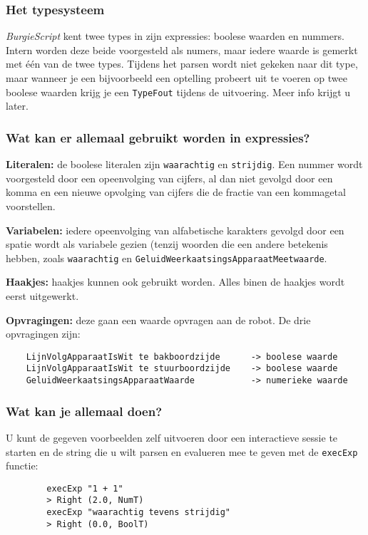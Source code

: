 \documentclass[11pt]{article}
\begin{document}
\subsubsection{Het typesysteem}
\textit{BurgieScript} kent twee types in zijn expressies: boolese waarden en nummers. Intern worden deze beide voorgesteld als numers, maar iedere waarde is gemerkt met één van de twee types. Tijdens het parsen wordt niet gekeken naar dit type, maar wanneer je een bijvoorbeeld een optelling probeert uit te voeren op twee boolese waarden krijg je een \texttt{TypeFout} tijdens de uitvoering. Meer info krijgt u later.

\subsubsection{Wat kan er allemaal gebruikt worden in expressies?}
    \begin{description}
        \item{\bf Literalen:} de boolese literalen zijn \texttt{waarachtig} en \texttt{strijdig}. Een nummer wordt voorgesteld door een opeenvolging van cijfers, al dan niet gevolgd door een komma en een nieuwe opvolging van cijfers die de fractie van een kommagetal voorstellen.
        \item{\bf Variabelen:} iedere opeenvolging van alfabetische karakters gevolgd door een spatie wordt als variabele gezien (tenzij woorden die een andere betekenis hebben, zoals \texttt{waarachtig} en \texttt{GeluidWeerkaatsingsApparaatMeetwaarde}.
        \item{\bf Haakjes:} haakjes kunnen ook gebruikt worden. Alles binen de haakjes wordt eerst uitgewerkt.
        \item{\bf Opvragingen:} deze gaan een waarde opvragen aan de robot. De drie opvragingen zijn:
        \begin{lstlisting}
    LijnVolgApparaatIsWit te bakboordzijde      -> boolese waarde
    LijnVolgApparaatIsWit te stuurboordzijde    -> boolese waarde
    GeluidWeerkaatsingsApparaatWaarde           -> numerieke waarde\end{lstlisting}
\end{description}

\subsubsection{Wat kan je allemaal doen?}
U kunt de gegeven voorbeelden zelf uitvoeren door een interactieve sessie te starten en de string die u wilt parsen en evalueren mee te geven met de \texttt{execExp} functie:
        \begin{lstlisting}
        execExp "1 + 1"
        > Right (2.0, NumT)
        execExp "waarachtig tevens strijdig"
        > Right (0.0, BoolT)\end{lstlisting}
\end{document}
